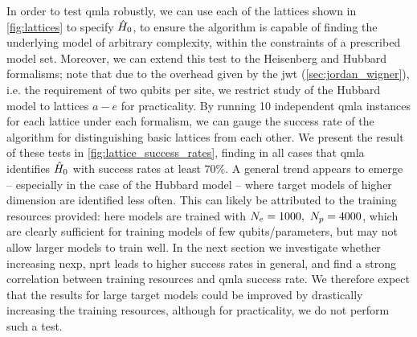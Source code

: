 In order to test \gls{qmla} robustly, 
    we can use each of the lattices shown in \cref{fig:lattices} to specify $\hat{H}_0$, 
    to ensure the algorithm is capable of finding the underlying model of arbitrary complexity, 
    within the constraints of a prescribed model set\footnotemark. 
Moreover, we can extend this test to the Heisenberg and Hubbard formalisms; 
    note that due to the overhead given by the \gls{jwt} (\cref{sec:jordan_wigner}), i.e. the requirement of two qubits per site, 
    we restrict study of the Hubbard model to lattices $a-e$ for practicality\footnotemark.
By running 10 independent \gls{qmla} \glspl{instance} for each lattice under each formalism,
    we can gauge the success rate of the algorithm for distinguishing basic lattices from each other. 
We present the result of these tests in \cref{fig:lattice_success_rates},   
    finding in all cases that \gls{qmla} identifies $\hat{H}_0$ with \glspl{success rate} at least $70\%$. 
A general trend appears to emerge -- especially in the case of the Hubbard model --
    where target models of higher dimension are identified less often. 
This can likely be attributed to the training resources provided:
    here models are trained with $N_e=1000, \ N_p=4000$, 
    which are clearly sufficient for training models of few qubits/parameters, 
    but may not allow larger models to train well.  
In the next section we investigate whether increasing \gls{nexp}, \gls{nprt} leads to higher \glspl{success rate} in general, 
    and find a strong correlation between training resources and \gls{qmla} \gls{success rate}. 
We therefore expect that the results for large target models could be improved by drastically increasing the training resources, 
    although for practicality, we do not perform such a test.
\par 


